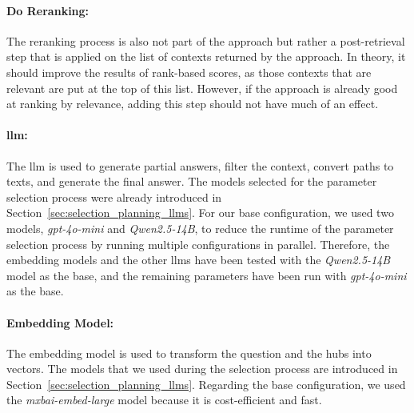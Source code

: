 \paragraph{Do Reranking:} The reranking process is also not part of the approach but rather a post-retrieval step that is applied on the list of contexts returned by the approach. In theory, it should improve the results of rank-based scores, as those contexts that are relevant are put at the top of this list. However, if the approach is already good at ranking by relevance, adding this step should not have much of an effect. 

\paragraph{\gls{llm}:} The \gls{llm} is used to generate partial answers, filter the context, convert paths to texts, and generate the final answer. The models selected for the parameter selection process were already introduced in Section~\ref{sec:selection_planning_llms}. For our base configuration, we used two models, \emph{gpt-4o-mini} and \emph{Qwen2.5-14B}, to reduce the runtime of the parameter selection process by running multiple configurations in parallel. Therefore, the embedding models and the other \glspl{llm} have been tested with the \emph{Qwen2.5-14B} model as the base, and the remaining parameters have been run with \emph{gpt-4o-mini} as the base. 

\paragraph{Embedding Model:} The embedding model is used to transform the question and the hubs into vectors. The models that we used during the selection process are introduced in Section~\ref{sec:selection_planning_llms}. Regarding the base configuration, we used the \emph{mxbai-embed-large} model because it is cost-efficient and fast.







